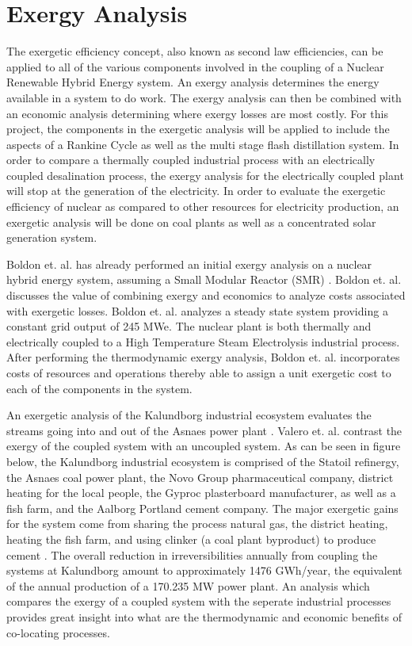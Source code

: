 \documentclass[12pt]{UIdahoMastersThesis}
\begin{document}
\section{Exergy Analysis}
The exergetic efficiency concept, also known as second law efficiencies, can be applied to all of the various components involved in the coupling of a Nuclear Renewable Hybrid Energy system. An exergy analysis determines the energy available in a system to do work. The exergy analysis can then be combined with an economic analysis determining where exergy losses are most costly. For this project, the components in the exergetic analysis will be applied to include the aspects of a Rankine Cycle as well as the multi stage flash distillation system. In order to compare a thermally coupled industrial process with an electrically coupled desalination process, the exergy analysis for the electrically coupled plant will stop at the generation of the electricity. In order to evaluate the exergetic efficiency of nuclear as compared to other resources for electricity production, an exergetic analysis will be done on coal plants as well as a concentrated solar generation system.

  Boldon et. al. has already performed an initial exergy analysis on a nuclear hybrid energy system, assuming a Small Modular Reactor (SMR) \cite{Boldon}. Boldon et. al. discusses the value of combining exergy and economics to analyze costs associated with exergetic losses.  Boldon et. al. analyzes a steady state system providing a constant grid output of 245 MWe.  The nuclear plant is both thermally and electrically coupled to a High Temperature Steam Electrolysis industrial process. After performing the thermodynamic exergy analysis, Boldon et. al. incorporates costs of resources and operations thereby able to assign a unit exergetic cost to each of the components in the system.

 An exergetic analysis of the Kalundborg industrial ecosystem evaluates the streams going into and out of the Asnaes power plant \cite{Valero2012}.  Valero et. al. contrast the exergy of the coupled system with an uncoupled system. As can be seen in figure below, the Kalundborg industrial ecosystem is comprised of the Statoil refinergy, the Asnaes coal power plant, the Novo Group pharmaceutical company, district heating for the local people, the Gyproc plasterboard manufacturer, as well as a fish farm, and  the Aalborg Portland cement company. The major exergetic gains for the system come from sharing the process natural gas, the district heating, heating the fish farm, and using clinker (a coal plant byproduct) to produce cement \cite{Valero2012}. The overall reduction in irreversibilities annually from coupling the systems at Kalundborg amount to approximately 1476 GWh/year, the equivalent of the annual production of a 170.235 MW power plant. An analysis which compares the exergy of a coupled system with the seperate industrial processes provides great insight into what are the thermodynamic and economic benefits of co-locating processes.
\end{document}
